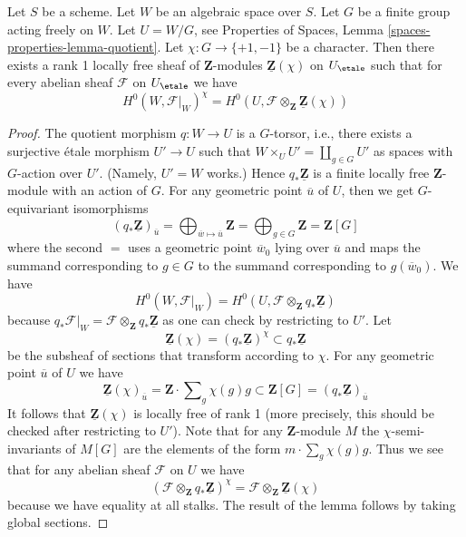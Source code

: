 \begin{lemma}
\label{lemma-twist}
Let $S$ be a scheme. Let $W$ be an algebraic space over $S$.
Let $G$ be a finite group acting freely on $W$.
Let $U = W/G$, see
Properties of Spaces, Lemma \ref{spaces-properties-lemma-quotient}.
Let $\chi : G \to \{+1, -1\}$ be a character.
Then there exists a rank 1 locally free sheaf of $\mathbf{Z}$-modules
$\underline{\mathbf{Z}}(\chi)$ on $U_\etale$ such that for every
abelian sheaf $\mathcal{F}$ on $U_\etale$ we have
$$
H^0(W, \mathcal{F}|_W)^\chi =
H^0(U, \mathcal{F} \otimes_{\mathbf{Z}} \underline{\mathbf{Z}}(\chi))
$$
\end{lemma}

\begin{proof}
The quotient morphism $q : W \to U$ is a $G$-torsor, i.e., there exists
a surjective \'etale morphism $U' \to U$ such that
$W \times_U U' = \coprod_{g \in G} U'$ as spaces with $G$-action over $U'$.
(Namely, $U' = W$ works.) Hence $q_*\underline{\mathbf{Z}}$ is a finite
locally free $\mathbf{Z}$-module with an action of $G$. For any
geometric point $\overline{u}$ of $U$, then we get $G$-equivariant
isomorphisms
$$
(q_*\underline{\mathbf{Z}})_{\overline{u}}
= \bigoplus\nolimits_{\overline{w} \mapsto \overline{u}} \mathbf{Z}
= \bigoplus\nolimits_{g \in G} \mathbf{Z} = \mathbf{Z}[G]
$$
where the second $=$ uses a geometric point
$\overline{w}_0$ lying over $\overline{u}$ and
maps the summand corresponding to $g \in G$ to the summand
corresponding to $g(\overline{w}_0)$. We have
$$
H^0(W, \mathcal{F}|_W) =
H^0(U, \mathcal{F} \otimes_\mathbf{Z} q_*\underline{\mathbf{Z}})
$$
because
$q_*\mathcal{F}|_W = \mathcal{F} \otimes_\mathbf{Z} q_*\underline{\mathbf{Z}}$
as one can check by restricting to $U'$. Let
$$
\underline{\mathbf{Z}}(\chi) =
(q_*\underline{\mathbf{Z}})^\chi \subset
q_*\underline{\mathbf{Z}}
$$
be the subsheaf of sections that transform according to $\chi$. For
any geometric point $\overline{u}$ of $U$ we have
$$
\underline{\mathbf{Z}}(\chi)_{\overline{u}} =
\mathbf{Z} \cdot \sum\nolimits_g \chi(g) g
\subset
\mathbf{Z}[G] = (q_*\underline{\mathbf{Z}})_{\overline{u}}
$$
It follows that $\underline{\mathbf{Z}}(\chi)$ is locally free of
rank 1 (more precisely, this should be checked after restricting to $U'$).
Note that for any $\mathbf{Z}$-module $M$ the $\chi$-semi-invariants
of $M[G]$ are the elements of the form $m \cdot \sum\nolimits_g \chi(g) g$.
Thus we see that for any abelian sheaf $\mathcal{F}$ on $U$ we have
$$
\left(\mathcal{F} \otimes_\mathbf{Z} q_*\underline{\mathbf{Z}}\right)^\chi
=
\mathcal{F} \otimes_\mathbf{Z} \underline{\mathbf{Z}}(\chi)
$$
because we have equality at all stalks. The result of the lemma follows by
taking global sections.
\end{proof}

